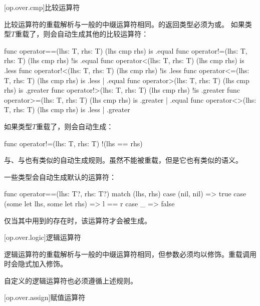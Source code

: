 [op.over.cmp]{比较运算符}

\pnum
比较运算符的重载解析与一般的中缀运算符相同。的返回类型必须为或。
如果类型$T$重载了，则会自动生成其他的比较运算符：

\begin{codeblock}
func operator==(lhs: T, rhs: T) { (lhs cmp rhs) is .equal }
func operator!=(lhs: T, rhs: T) { (lhs cmp rhs) !is .equal }
func operator<(lhs: T, rhs: T) { (lhs cmp rhs) is .less }
func operator!<(lhs: T, rhs: T) { (lhs cmp rhs) !is .less }
func operator<=(lhs: T, rhs: T) { (lhs cmp rhs) is .less | .equal }
func operator>(lhs: T, rhs: T) { (lhs cmp rhs) is .greater }
func operator!>(lhs: T, rhs: T) { (lhs cmp rhs) !is .greater }
func operator>=(lhs: T, rhs: T) { (lhs cmp rhs) is .greater | .equal }
func operator<>(lhs: T, rhs: T) { (lhs cmp rhs) is .less | .greater }
\end{codeblock}

\pnum
如果类型$T$重载了，则会自动生成：

\begin{codeblock}
func operator!=(lhs: T, rhs: T) { !(lhs == rhs) }
\end{codeblock}

与、与也有类似的自动生成规则。\enternote 虽然不能被重载，但是它也有类似的语义。\exitnote

\pnum
一些类型会自动生成默认的运算符：

\begin{codeblock}

func operator==(lhs: T?, rhs: T?) {
    match (lhs, rhs) {
        case (nil, nil) => true
        case (some let lhs, some let rhs) => l == r
        case _ => false
    }
}

\end{codeblock}

仅当其中用到的存在时，该运算符才会被生成。

[op.over.logic]{逻辑运算符}

\pnum
逻辑运算符的重载解析与一般的中缀运算符相同，但参数必须均以修饰。重载调用时会隐式加入修饰。

\pnum
自定义的逻辑运算符也必须遵循上述规则。

[op.over.assign]{赋值运算符}

